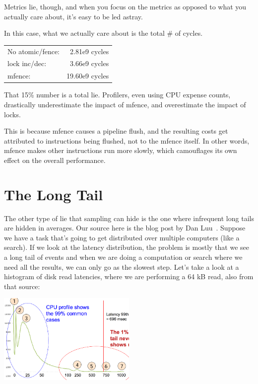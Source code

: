 \documentclass[a4paper]{report}
\begin{document}
Metrics lie, though, and when you focus on the metrics as opposed to what you
actually care about, it's easy to be led astray.

In this case, what we actually care about is the total \# of cycles.

    \begin{tabular}{lr}
    No atomic/fence:& 2.81e9 cycles\\
    lock inc/dec: & 3.66e9 cycles\\
    mfence: & 19.60e9 cycles
    \end{tabular}

That 15\% number is a total lie.
Profilers, even using CPU expense counts, drastically underestimate the impact of mfence,
and overestimate the impact of locks.

This is because mfence causes a pipeline flush, and the resulting 
costs get attributed to instructions being flushed, not to the mfence itself. In other
words, mfence makes other instructions run more slowly, which camouflages its own effect
on the overall performance.


\section*{The Long Tail}

The other type of lie that sampling can hide is the one where infrequent long tails are hidden in averages.
Our source here is the blog post by Dan Luu~\cite{perf-tracing}. Suppose we have a task that's going to get distributed over multiple computers (like a search). If we look at the latency distribution, the problem is mostly that we see a long tail of events and when we are doing a computation or search where we need all the results, we can only go as the slowest step. Let's take a look at a histogram of disk read latencies, where we are performing a 64 kB read, also from that source:

\begin{center}
	\includegraphics[width=0.5\textwidth]{images/disk_tail.png}
\end{center}
\end{document}
